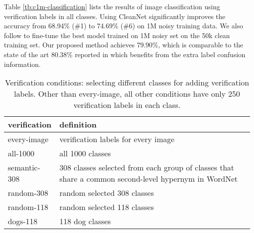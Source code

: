 \documentclass[10pt,twocolumn,letterpaper]{article}
\begin{document}
Table \ref{tb:c1m-classification} lists the results of image classification using verification labels in all classes. Using CleanNet significantly improves the accuracy from 68.94\% (\#1) to 74.69\% (\#6) on 1M noisy training data. We also follow \cite{patrini2017making} to fine-tune the best model trained on 1M noisy set on the 50k clean training set. Our proposed method achieves 79.90\%, which is comparable to the state of the art 80.38\% reported in \cite{patrini2017making} which benefits from the extra label confusion information.


\begin{table}
\begin{center}
\small
\begin{tabular}{|l|l|}
\hline
verification & definition \\
\hline\hline
every-image & verification labels for every image\\
\hline
all-1000 & all 1000 classes\\
\hline
semantic-308 & \parbox[t]{5.6cm}{308 classes selected from each group of classes that share a common second-level hypernym in WordNet \cite{miller1995wordnet}}\\
\hline
random-308 & random selected 308 classes\\
\hline
random-118 & random selected 118 classes\\
\hline
dogs-118 & 118 dog classes\\
\hline
\end{tabular}
\end{center}
\caption{Verification conditions: selecting different classes for adding verification labels. Other than every-image, all other conditions have only 250 verification labels in each class.}
\label{tb:webvision_veri}
\end{table}
\end{document}

